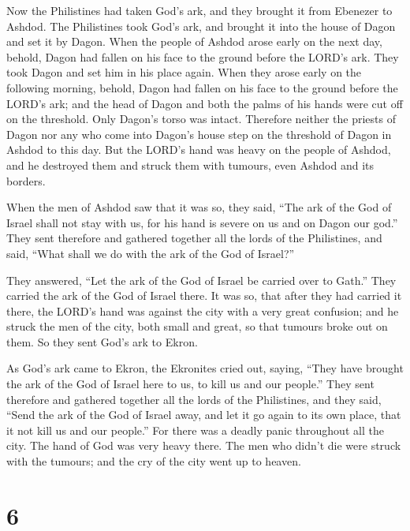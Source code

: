  Now the Philistines had taken God's ark, and they brought
it from Ebenezer to Ashdod.  The Philistines took God's
ark, and brought it into the house of Dagon and set it by Dagon.
 When the people of Ashdod arose early on the next day,
behold, Dagon had fallen on his face to the ground before the LORD's
ark. They took Dagon and set him in his place again.  When
they arose early on the following morning, behold, Dagon had fallen on
his face to the ground before the LORD's ark; and the head of Dagon and
both the palms of his hands were cut off on the threshold. Only Dagon's
torso was intact.  Therefore neither the priests of Dagon
nor any who come into Dagon's house step on the threshold of Dagon in
Ashdod to this day.  But the LORD's hand was heavy on the
people of Ashdod, and he destroyed them and struck them with tumours,
even Ashdod and its borders.

 When the men of Ashdod saw that it was so, they said,
``The ark of the God of Israel shall not stay with us, for his hand is
severe on us and on Dagon our god.''  They sent therefore
and gathered together all the lords of the Philistines, and said, ``What
shall we do with the ark of the God of Israel?''

They answered, ``Let the ark of the God of Israel be carried over to
Gath.'' They carried the ark of the God of Israel there. 
It was so, that after they had carried it there, the LORD's hand was
against the city with a very great confusion; and he struck the men of
the city, both small and great, so that tumours broke out on them.
 So they sent God's ark to Ekron.

As God's ark came to Ekron, the Ekronites cried out, saying, ``They have
brought the ark of the God of Israel here to us, to kill us and our
people.''  They sent therefore and gathered together all
the lords of the Philistines, and they said, ``Send the ark of the God
of Israel away, and let it go again to its own place, that it not kill
us and our people.'' For there was a deadly panic throughout all the
city. The hand of God was very heavy there.  The men who
didn't die were struck with the tumours; and the cry of the city went up
to heaven.

\hypertarget{section-5}{%
\section{6}\label{section-5}}

